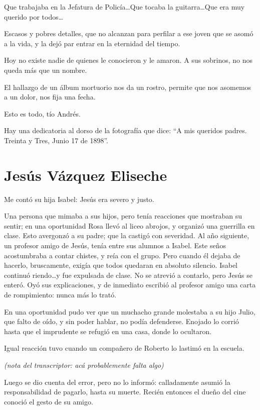 \documentclass[a4paper]{article}
\begin{document}
Que trabajaba en la Jefatura de Policía\ldots Que tocaba la guitarra\ldots Que era muy querido por todos\ldots

Escasos y pobres detalles, que no alcanzan para perfilar a ese joven que se asomó a la vida, y la dejó par entrar en la eternidad del tiempo.

Hoy no existe nadie de quienes le conocieron y le amaron. A sus sobrinos, no nos queda más que un nombre.

El hallazgo de un álbum mortuorio nos da un rostro, permite que nos asomemos a un dolor, nos fija una fecha.

Esto es todo, tío Andrés.

Hay una dedicatoria al dorso de la fotografía que dice: ``A mis queridos padres. Treinta y Tres, Junio 17 de 1898''.

\section{Jesús Vázquez Eliseche}

Me contó su hija Isabel: Jesús era severo y justo.\ 

Una persona que mimaba a sus hijos, pero tenía reacciones que mostraban su sentir; en una oportunidad Rosa llevó al liceo abrojos, y organizó una guerrilla en clase. Esto avergonzó a su padre; que la castigó con severidad. Al año siguiente, un profesor amigo de Jesús, tenía entre sus alumnos a Isabel. Este seños acostumbraba a contar chistes, y reía con el grupo. Pero cuando él dejaba de hacerlo, bruscamente, exigía que todos quedaran en absoluto silencio. Isabel continuó riendo\ldots y fue expulsada de clase. No se atrevió a contarlo, pero Jesús se enteró. Oyó sus explicaciones, y de inmediato escribió al profesor amigo una carta de rompimiento: nunca más lo trató.

\bigbreak{}

En una oportunidad pudo ver que un muchacho grande molestaba a su hijo Julio, que falto de oído, y sin poder hablar, no podía defenderse. Enojado lo corrió hasta que el imprudente se refugió en una casa, donde lo ocultaron.

Igual reacción tuvo cuando un compañero de Roberto lo lastimó en la escuela.

\bigbreak{}

\emph{(nota del transcriptor: acá probablemente falta algo)}

\bigbreak{}

Luego se dio cuenta del error, pero no lo informó: calladamente asumió la responsabilidad de pagarlo, hasta su muerte. Recién entonces el dueño del cine conoció el gesto de su amigo.
\end{document}
